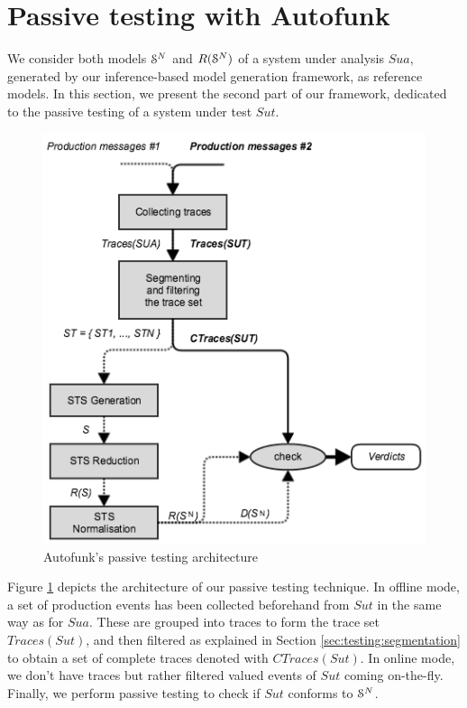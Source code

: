 
\section{Passive testing with Autofunk}
\label{sec:testing:passive}

We consider both models $\EuScript{S}^{N}$ and
$R(\EuScript{S}^{N})$ of a system under analysis $\mathit{Sua}$,
generated by our inference-based model generation framework, as
reference models. In this section, we present the second part of
our framework, dedicated to the passive testing of a system under
test $\mathit{Sut}$.

\begin{figure}[ht]
\includegraphics[width=0.85\linewidth]{figures/passive_autofunk.png}

\caption{Autofunk's passive testing architecture}
\label{fig:passive-autofunk}
\end{figure}

Figure \ref{fig:passive-autofunk} depicts the architecture of our
passive testing technique. In offline mode, a set of production
events has been collected beforehand from $\mathit{Sut}$ in the
same way as for $\mathit{Sua}$. These are grouped into traces to
form the trace set $Traces({Sut})$, and then filtered as
explained in Section \ref{sec:testing:segmentation} to obtain a
set of complete traces denoted with $CTraces({Sut})$. In online
mode, we don't have traces but rather filtered valued events of
$\mathit{Sut}$ coming on-the-fly. Finally, we perform passive
testing to check if $\mathit{Sut}$ conforms to
$\EuScript{S}^{N}$.

